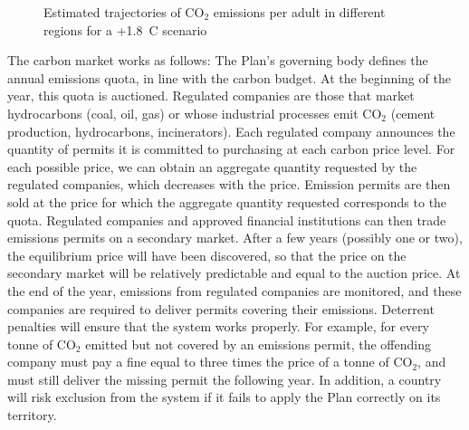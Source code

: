 \documentclass[a5paper,english,openany]{memoir}
\begin{document}
\begin{figure}[h!]
  \caption[Emissions trajectories by region]{Estimated trajectories of CO$_\text{2}$ emissions per adult in different regions for a +1.8~\textdegree{}C scenario}\label{fig:emissions_par_region}
\end{figure}



The carbon market works as follows: %
The Plan's governing body defines the annual emissions quota, in line with the carbon budget. At the beginning of the year, this quota is auctioned. %
Regulated companies are those that market hydrocarbons (coal, oil, gas) or whose industrial processes emit CO$_\text{2}$ (cement production, hydrocarbons, incinerators). 
Each regulated company announces the quantity of permits it is committed to purchasing at each carbon price level. For each possible price, we can %
obtain an aggregate quantity requested by the regulated companies, which decreases with the price. Emission permits are then sold at the price for which the aggregate quantity requested corresponds to the quota. Regulated companies and approved financial institutions can then trade emissions permits on a secondary market. After a few years (possibly one or two), 
the equilibrium price will have been discovered, so that the price on the secondary market will be relatively predictable and equal to the auction price. At the end of the year, emissions from regulated companies are monitored, and these companies are required to deliver permits covering their emissions. %
Deterrent penalties will ensure %
that the system works properly. For example, for every tonne of CO$_\text{2}$ emitted but not covered by an emissions permit, the offending company must pay a fine equal to three times the price of a tonne of CO$_\text{2}$, and must still deliver the missing permit the following year. In addition, a country will risk %
exclusion from the system if it fails to apply the Plan correctly on its territory. %
\end{document}
